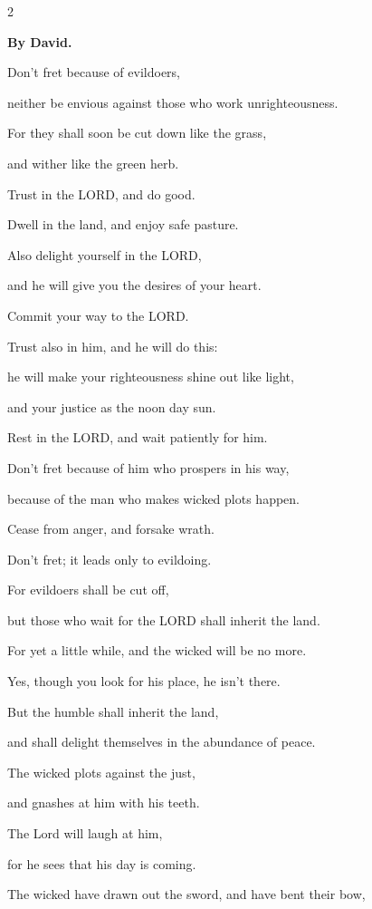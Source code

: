 \begin{multicols}{2}
	
	\mychapter{}\textbf{By David.}
	
	\quad \myverse*{}Don’t fret because of evildoers,
	
	neither be envious against those who work unrighteousness.
	
	
	\myverse{}For they shall soon be cut down like the grass,
	
	and wither like the green herb.
	
	
	\myverse{}Trust in the LORD, and do good.
	
	Dwell in the land, and enjoy safe pasture.
	
	
	\myverse{}Also delight yourself in the LORD,
	
	and he will give you the desires of your heart.
	
	
	\myverse{}Commit your way to the LORD.
	
	Trust also in him, and he will do this:
	
	
	\myverse{}he will make your righteousness shine out like light,
	
	and your justice as the noon day sun.
	
	
	\myverse{}Rest in the LORD, and wait patiently for him.
	
	Don’t fret because of him who prospers in his way,
	
	because of the man who makes wicked plots happen.
	
	
	\myverse{}Cease from anger, and forsake wrath.
	
	Don’t fret; it leads only to evildoing.
	
	
	\myverse{}For evildoers shall be cut off,
	
	but those who wait for the LORD shall inherit the land.
	
	
	\myverse{}For yet a little while, and the wicked will be no more.
	
	Yes, though you look for his place, he isn’t there.
	
	
	\myverse{}But the humble shall inherit the land,
	
	and shall delight themselves in the abundance of peace.
	
	
	\myverse{}The wicked plots against the just,
	
	and gnashes at him with his teeth.
	
	
	\myverse{}The Lord will laugh at him,
	
	for he sees that his day is coming.
	
	
	\myverse{}The wicked have drawn out the sword, and have bent their bow,
	

\end{multicols}

